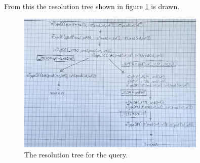 From this the resolution tree shown in figure \ref{fig:resTree} is drawn.

\begin{figure}[h]
\centering
\includegraphics[width=0.8\textwidth]{resTree.jpg}
\caption{The resolution tree for the query.}
\label{fig:resTree}
\end{figure}
